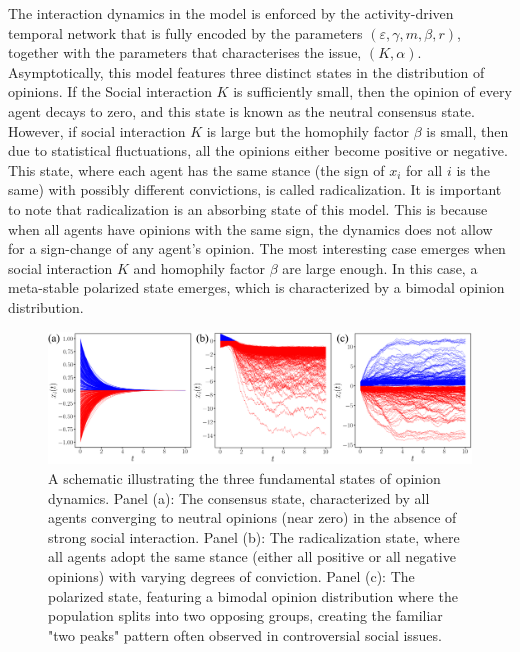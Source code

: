 The interaction dynamics in the model is enforced by the activity-driven temporal network that is fully encoded 
by the parameters $(\varepsilon, \gamma, m, \beta, r)$, together with the parameters that characterises the issue, $(K, \alpha)$. Asymptotically, this model features three distinct states in the distribution of opinions. If the Social interaction $K$ is sufficiently small, then the opinion of every agent decays to zero, and this state is known as the neutral consensus state. However, if social interaction $K$ is large but the homophily factor $\beta$ is small, then due to statistical fluctuations, all the opinions either become positive or negative. This state, where each agent has the same stance (the sign of $x_i$ for all $i$ is the same) with possibly different convictions, is called radicalization. It is important to note that radicalization is an absorbing state of this model. This is because when all agents have opinions with the same sign, the dynamics does not allow for a sign-change of any agent's opinion. The most interesting case emerges when social interaction $K$ and homophily factor $\beta$ are large enough. In this case, a meta-stable polarized state emerges, which is characterized by a bimodal opinion distribution.
\begin{figure}[H]
    \centering
    \includegraphics[width=\textwidth]{chapters/chapter2/consensus_radicalization_polarization.pdf}
    \caption{A schematic illustrating the three fundamental states of opinion dynamics. Panel (a): The consensus state, characterized by all agents converging to neutral opinions (near zero) in the absence of strong social interaction. Panel (b): The radicalization state, where all agents adopt the same stance (either all positive or all negative opinions) with varying degrees of conviction. Panel (c): The polarized state, featuring a bimodal opinion distribution where the population splits into two opposing groups, creating the familiar "two peaks" pattern often observed in controversial social issues.}
    \label{fig:three_states}
\end{figure}
